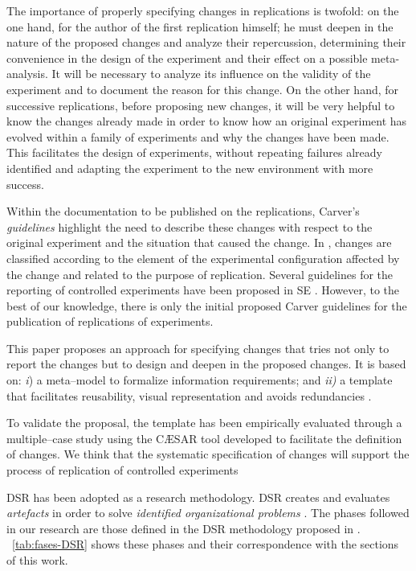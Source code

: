 The importance of properly specifying changes in replications is twofold: on the one hand, for the author of the first replication himself; he must deepen in the nature of the proposed changes and analyze their repercussion, determining their convenience in the design of the experiment and their effect on a possible meta-analysis.
It will be necessary to analyze its influence on the validity of the experiment and to document the reason for this change.
On the other hand, for successive replications, before proposing new changes, it will be very helpful to know the changes already made in order to know how an original experiment has evolved within a family of experiments and why the changes have been made. This facilitates the design of experiments, without repeating failures already identified and adapting the experiment to the new environment with more success. 

Within the documentation to be published on the replications, Carver's \emph{guidelines} \cite{carver2010towards} highlight the need to describe these changes with respect to the original experiment and the situation that caused the change. In \cite{gomez2014understanding}, changes are classified according to the element of the experimental configuration affected by the change and related to the purpose of replication.
Several guidelines for the reporting of controlled experiments have been proposed in \gls{SE} \cite{jedlitschka2008reporting,juristo2013basics,wohlin:experimentation}. 
However, to the best of our knowledge, there is only the initial proposed Carver guidelines \cite{carver2010towards} for the publication of replications of experiments.
 

This paper proposes an approach for specifying changes that tries not only to report the changes but to design and deepen in the proposed changes. It is based on: \emph{i}) a meta--model to formalize information requirements; and \emph{ii)} a template that facilitates reusability, visual representation and avoids redundancies \cite{duran1999requirements,del2016using}. 

To validate the proposal, the template has been empirically evaluated through a multiple--case study using the CÆSAR tool developed to facilitate the definition of changes.
We think that the systematic specification of changes will support the process of replication of controlled experiments



\gls{DSR} has been adopted as a research methodology. \gls{DSR} creates and evaluates \emph{artefacts} in order to solve \emph{identified organizational problems} \cite{von2004design}. The phases followed in our research are those defined in the DSR methodology proposed in \cite{peffers2007design}. \tablename~\ref{tab:fases-DSR} shows these phases and their correspondence with the sections of this work.

